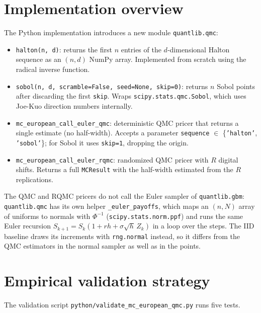 \documentclass[11pt,a4paper]{article}
\theoremstyle{plain}
\theoremstyle{definition}
\theoremstyle{remark}
\begin{document}
\section{Implementation overview}
\label{sec:impl}

The Python implementation introduces a new module \texttt{quantlib.qmc}:

\begin{itemize}
\item \texttt{halton(n, d)}: returns the first $n$ entries of the
$d$-dimensional Halton sequence as an $(n, d)$ NumPy array.
Implemented from scratch using the radical inverse function.
\item \texttt{sobol(n, d, scramble=False, seed=None, skip=0)}: returns
$n$ Sobol points after discarding the first \texttt{skip}. Wraps
\texttt{scipy.stats.qmc.Sobol}, which uses Joe-Kuo direction numbers
internally.
\item \texttt{mc\_european\_call\_euler\_qmc}: deterministic QMC
pricer that returns a single estimate (no half-width). Accepts a
parameter \texttt{sequence} $\in$ \{\texttt{'halton'},
\texttt{'sobol'}\}; for Sobol it uses \texttt{skip=1}, dropping the
origin.
\item \texttt{mc\_european\_call\_euler\_rqmc}: randomized QMC
pricer with $R$ digital shifts. Returns a full \texttt{MCResult}
with the half-width estimated from the $R$ replications.
\end{itemize}

The QMC and RQMC pricers do not call the Euler sampler of
\texttt{quantlib.gbm}: \texttt{quantlib.qmc} has its own helper
\texttt{\_euler\_payoffs}, which maps an $(n, N)$ array of uniforms
to normals with $\Phi^{-1}$ (\texttt{scipy.stats.norm.ppf}) and runs
the same Euler recursion $S_{k+1} = S_k (1 + r h + \sigma \sqrt h \,
Z_k)$ in a loop over the steps. The IID baseline draws its
increments with \texttt{rng.normal} instead, so it differs from the
QMC estimators in the normal sampler as well as in the points.

\section{Empirical validation strategy}
\label{sec:validation}

The validation script \texttt{python/validate\_mc\_european\_qmc.py}
runs five tests.
\end{document}
